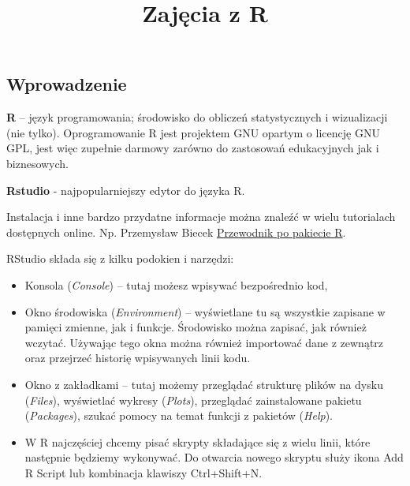 \documentclass[]{article}
\title{Zajęcia z R}
\author{}
\date{}
\begin{document}
\maketitle

\subsection{Wprowadzenie}\label{wprowadzenie}

\textbf{R} -- język programowania; środowisko do obliczeń statystycznych
i wizualizacji (nie tylko). Oprogramowanie R jest projektem GNU opartym
o licencję GNU GPL, jest więc zupełnie darmowy zarówno do zastosowań
edukacyjnych jak i biznesowych.

\textbf{Rstudio} - najpopularniejszy edytor do języka R.

Instalacja i inne bardzo przydatne informacje można znaleźć w wielu
tutorialach dostępnych online. Np. Przemysław Biecek
\href{http://biecek.pl/r/przewodnikpopakiecierwydanieiiiinternet.pdf}{Przewodnik
po pakiecie R}.

RStudio składa się z kilku podokien i narzędzi:

\begin{itemize}
\item
  Konsola (\emph{Console}) -- tutaj możesz wpisywać bezpośrednio kod,
\item
  Okno środowiska (\emph{Environment}) -- wyświetlane tu są wszystkie
  zapisane w pamięci zmienne, jak i funkcje. Środowisko można zapisać,
  jak również wczytać. Używając tego okna można również importować dane
  z zewnątrz oraz przejrzeć historię wpisywanych linii kodu.
\item
  Okno z zakładkami -- tutaj możemy przeglądać strukturę plików na dysku
  (\emph{Files}), wyświetlać wykresy (\emph{Plots}), przeglądać
  zainstalowane pakietu (\emph{Packages}), szukać pomocy na temat
  funkcji z pakietów (\emph{Help}).
\item
  W R najczęściej chcemy pisać skrypty składające się z wielu linii,
  które następnie będziemy wykonywać. Do otwarcia nowego skryptu służy
  ikona Add R Script lub kombinacja klawiszy Ctrl+Shift+N.
\end{itemize}
\end{document}
